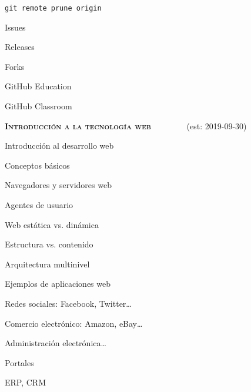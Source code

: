 \begin{longenum}
\begin{longenum}
\begin{longenum}
\begin{longenum}
                \begin{longenum}
                    \item \texttt{git remote prune origin}
                \end{longenum}
            \end{longenum}
            \item Issues
            \item Releases
            \item Forks
            \item GitHub Education
            \begin{longenum}
                \item GitHub Classroom
            \end{longenum}
        \end{longenum}
    \end{longenum}
    \item \textbf{\textsc{Introducción a la tecnología web}} \ \ \ \ \ \ \ \ (est: \mbox{2019-09-30})
    \begin{longenum}
        \item Introducción al desarrollo web
        \begin{longenum}
            \item Conceptos básicos
            \begin{longenum}
                \item Navegadores y servidores web
                \item Agentes de usuario
                \item Web estática vs. dinámica
                \item Estructura vs. contenido
                \item Arquitectura multinivel
            \end{longenum}
            \item Ejemplos de aplicaciones web
            \begin{longenum}
                \item Redes sociales: Facebook, Twitter…
                \item Comercio electrónico: Amazon, eBay…
                \item Administración electrónica…
                \item Portales
                \item ERP, CRM
            \end{longenum}

\end{longenum}
\end{longenum}
\end{longenum}
